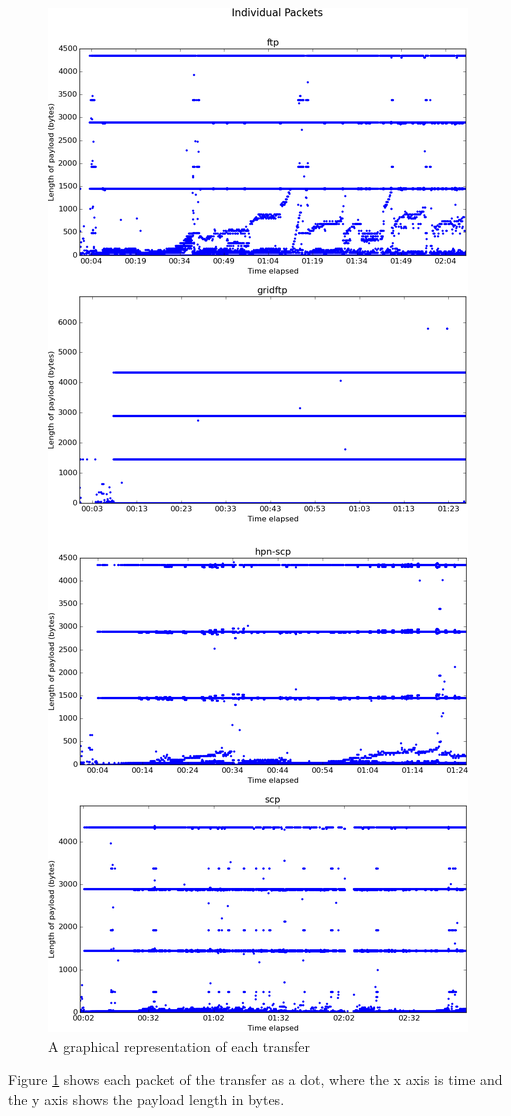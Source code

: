 \documentclass{sig-alternate-05-2015}
\begin{document}
\begin{figure}
	\centering
	\includegraphics[height=\textheight]{img/testdata_packets.png}
	\caption{A graphical representation of each transfer
	         \label{fig:testdata_packets}}
\end{figure}
Figure \ref{fig:testdata_packets} shows each packet of the transfer as a dot, where the x axis is time and the y axis shows the payload length in bytes.
\end{document}
